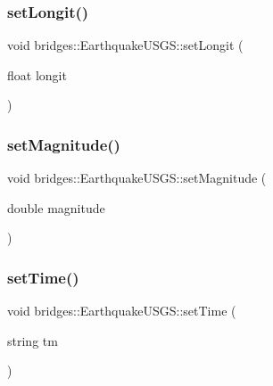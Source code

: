 \subsubsection{\texorpdfstring{set\+Longit()}{setLongit()}}
{\footnotesize\ttfamily void bridges\+::\+Earthquake\+U\+S\+G\+S\+::set\+Longit (\begin{DoxyParamCaption}\item[{float}]{longit }\end{DoxyParamCaption})\hspace{0.3cm}{\ttfamily [inline]}}

\hypertarget{classbridges_1_1_earthquake_u_s_g_s_aae8be6112f5c27c168c452261d9b29a2}{}\label{classbridges_1_1_earthquake_u_s_g_s_aae8be6112f5c27c168c452261d9b29a2} 
\subsubsection{\texorpdfstring{set\+Magnitude()}{setMagnitude()}}
{\footnotesize\ttfamily void bridges\+::\+Earthquake\+U\+S\+G\+S\+::set\+Magnitude (\begin{DoxyParamCaption}\item[{double}]{magnitude }\end{DoxyParamCaption})\hspace{0.3cm}{\ttfamily [inline]}}

\hypertarget{classbridges_1_1_earthquake_u_s_g_s_a70d79cd5c3666b8a32b1d45d7364054b}{}\label{classbridges_1_1_earthquake_u_s_g_s_a70d79cd5c3666b8a32b1d45d7364054b} 
\subsubsection{\texorpdfstring{set\+Time()}{setTime()}}
{\footnotesize\ttfamily void bridges\+::\+Earthquake\+U\+S\+G\+S\+::set\+Time (\begin{DoxyParamCaption}\item[{string}]{tm }\end{DoxyParamCaption})\hspace{0.3cm}{\ttfamily [inline]}}

\hypertarget{classbridges_1_1_earthquake_u_s_g_s_a78fe86dcb1bae8470d5ac58fdda2fe51}{}\label{classbridges_1_1_earthquake_u_s_g_s_a78fe86dcb1bae8470d5ac58fdda2fe51} 
